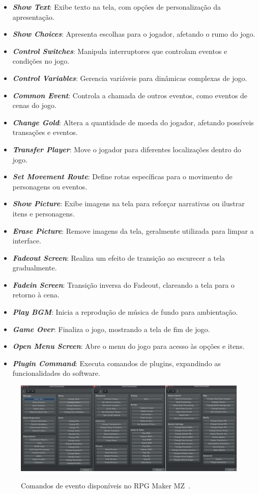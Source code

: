 \begin{itemize}
	\item \textit{\textbf{Show Text}}: Exibe texto na tela, com opções de personalização da apresentação.
	\item \textit{\textbf{Show Choices}}: Apresenta escolhas para o jogador, afetando o rumo do jogo.
	\item \textit{\textbf{Control Switches}}: Manipula interruptores que controlam eventos e condições no jogo.
	\item \textit{\textbf{Control Variables}}: Gerencia variáveis para dinâmicas complexas de jogo.
	\item \textit{\textbf{Common Event}}: Controla a chamada de outros eventos, como eventos de cenas do jogo.
	\item \textit{\textbf{Change Gold}}: Altera a quantidade de moeda do jogador, afetando possíveis transações e eventos.
	\item \textit{\textbf{Transfer Player}}: Move o jogador para diferentes localizações dentro do jogo.
	\item \textit{\textbf{Set Movement Route}}: Define rotas específicas para o movimento de personagens ou eventos.
	\item \textit{\textbf{Show Picture}}: Exibe imagens na tela para reforçar narrativas ou ilustrar itens e personagens.
	\item \textit{\textbf{Erase Picture}}: Remove imagens da tela, geralmente utilizada para limpar a interface.
	\item \textit{\textbf{Fadeout Screen}}: Realiza um efeito de transição ao escurecer a tela gradualmente.
	\item \textit{\textbf{Fadein Screen}}: Transição inversa do Fadeout, clareando a tela para o retorno à cena.
	\item \textit{\textbf{Play BGM}}: Inicia a reprodução de música de fundo para ambientação.
	\item \textit{\textbf{Game Over}}: Finaliza o jogo, mostrando a tela de fim de jogo.
	\item \textit{\textbf{Open Menu Screen}}: Abre o menu do jogo para acesso às opções e itens.
	\item \textit{\textbf{Plugin Command}}: Executa comandos de plugins, expandindo as funcionalidades do software.
\end{itemize}

\begin{figure}[ht]
	\centering
	\caption{Comandos de evento disponíveis no RPG Maker MZ~\cite{RPGMakerMZ}.}
	\includegraphics[scale=0.25]{Textuais/Pictures/Event-commands.png}
	\label{fig:rpgmaker-event-commands}
\end{figure}

